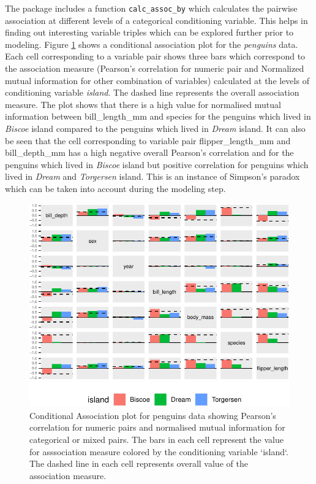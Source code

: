 The package includes a function \texttt{calc\_assoc\_by} which
calculates the pairwise association at different levels of a categorical
conditioning variable. This helps in finding out interesting variable
triples which can be explored further prior to modeling. Figure
\ref{fig:cond-assoc} shows a conditional association plot for the
\emph{penguins} data. Each cell corresponding to a variable pair shows
three bars which correspond to the association measure (Pearson's
correlation for numeric pair and Normalized mutual information for other
combination of variables) calculated at the levels of conditioning
variable \emph{island}. The dashed line represents the overall
association measure. The plot shows that there is a high value for
normalised mutual information between bill\_length\_mm and species for
the penguins which lived in \emph{Biscoe} island compared to the
penguins which lived in \emph{Dream} island. It can also be seen that
the cell corresponding to variable pair flipper\_length\_mm and
bill\_depth\_mm has a high negative overall Pearson's correlation and
for the penguins which lived in \emph{Biscoe} island but positive
correlation for penguins which lived in \emph{Dream} and
\emph{Torgersen} island. This is an instance of Simpson's paradox which
can be taken into account during the modeling step.

\begin{Schunk}
\begin{figure}

{\centering \includegraphics{rj_paper_files/figure-latex/cond-assoc-1} 

}

\caption[Conditional Association plot for penguins data showing Pearson's correlation for numeric pairs and normalised mutual information for categorical or mixed pairs]{Conditional Association plot for penguins data showing Pearson's correlation for numeric pairs and normalised mutual information for categorical or mixed pairs. The bars in each cell represent the value for asssociation measure colored by the conditioning variable `island`. The dashed line in each cell represents overall value of the association measure.}\label{fig:cond-assoc}
\end{figure}
\end{Schunk}

